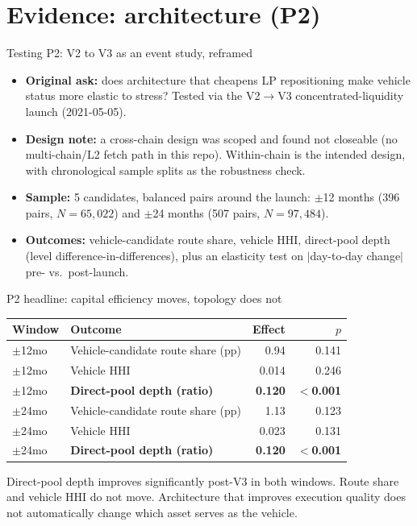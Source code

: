 \documentclass[aspectratio=169]{beamer}
\begin{document}
\section{Evidence: architecture (P2)}

\begin{frame}{Testing P2: V2 to V3 as an event study, reframed}
  \begin{itemize}
    \item \textbf{Original ask:} does architecture that cheapens LP repositioning make vehicle status more elastic to stress? Tested via the V2$\to$V3 concentrated-liquidity launch (2021-05-05).
    \item \textbf{Design note:} a cross-chain design was scoped and found not closeable (no multi-chain/L2 fetch path in this repo). Within-chain is the intended design, with chronological sample splits as the robustness check.
    \item \textbf{Sample:} 5 candidates, balanced pairs around the launch: $\pm$12 months (396 pairs, $N=65{,}022$) and $\pm$24 months (507 pairs, $N=97{,}484$).
    \item \textbf{Outcomes:} vehicle-candidate route share, vehicle HHI, direct-pool depth (level difference-in-differences), plus an elasticity test on $|$day-to-day change$|$ pre- vs.\ post-launch.
  \end{itemize}
\end{frame}

\begin{frame}{P2 headline: capital efficiency moves, topology does not}
  \small
  \begin{center}
  \begin{tabular}{@{}l l r r@{}}
    \toprule
    Window & Outcome & Effect & $p$ \\
    \midrule
    $\pm$12mo & Vehicle-candidate route share (pp) & 0.94 & 0.141 \\
    $\pm$12mo & Vehicle HHI & 0.014 & 0.246 \\
    $\pm$12mo & \textbf{Direct-pool depth (ratio)} & \textbf{0.120} & \textbf{$<$0.001} \\
    \midrule
    $\pm$24mo & Vehicle-candidate route share (pp) & 1.13 & 0.123 \\
    $\pm$24mo & Vehicle HHI & 0.023 & 0.131 \\
    $\pm$24mo & \textbf{Direct-pool depth (ratio)} & \textbf{0.120} & \textbf{$<$0.001} \\
    \bottomrule
  \end{tabular}
  \end{center}
  \vspace{0.6em}
  Direct-pool depth improves significantly post-V3 in both windows. Route share and vehicle HHI do not move. Architecture that improves execution quality does not automatically change which asset serves as the vehicle.
\end{frame}
\end{document}
